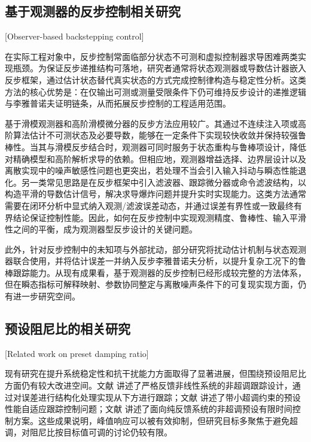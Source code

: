 \subsection{基于观测器的反步控制相关研究}[Observer-based backstepping control]

在实际工程对象中，反步控制常面临部分状态不可测和虚拟控制器求导困难两类实现瓶颈。为保证反步递推结构可落地，研究者通常将状态观测器或导数估计器嵌入反步框架，通过估计状态替代真实状态的方式完成控制律构造与稳定性分析\cite{ref2,ref5,ref74,ref76,ref77}。这类方法的核心优势是：在仅输出可测或测量受限条件下仍可维持反步设计的递推逻辑与李雅普诺夫证明链条，从而拓展反步控制的工程适用范围。

基于滑模观测器和高阶滑模微分器的反步方法应用较广。其通过不连续注入项或高阶算法估计不可测状态及必要导数，能够在一定条件下实现较快收敛并保持较强鲁棒性\cite{ref29,ref30,ref31,ref46}。当其与滑模反步结合时，观测器可同时服务于状态重构与鲁棒项设计，降低对精确模型和高阶解析求导的依赖。但相应地，观测器增益选择、边界层设计以及离散实现中的噪声敏感性问题也更突出，若处理不当会引入输入抖动与瞬态性能退化\cite{ref46,ref48,ref49}。另一类常见思路是在反步框架中引入滤波器、跟踪微分器或命令滤波结构，以构造平滑的导数估计信号，解决求导爆炸问题并提升实时实现能力\cite{ref6,ref7,ref5,ref74,ref76,ref77,ref82}。这类方法通常需要在闭环分析中显式纳入观测/滤波误差动态，并通过误差有界性或一致最终有界结论保证控制性能\cite{ref29,ref30,ref31,ref77,ref82}。因此，如何在反步控制中实现观测精度、鲁棒性、输入平滑性之间的平衡，成为观测器型反步设计的关键问题。

此外，针对反步控制中的未知项与外部扰动，部分研究将扰动估计机制与状态观测器联合使用，并将估计误差一并纳入反步李雅普诺夫分析，以提升复杂工况下的鲁棒跟踪能力\cite{ref24,ref51,ref36,ref32,ref33,ref34,ref35,ref52,ref53,ref54,ref55,ref56,ref77,ref81,ref82}。从现有成果看，基于观测器的反步控制已经形成较完整的方法体系，但在瞬态指标可解释映射、参数协同整定与离散噪声条件下的可复现实现方面，仍有进一步研究空间。

\subsection{预设阻尼比的相关研究}[Related work on preset damping ratio]

现有研究在提升系统稳定性和抗干扰能力方面取得了显著进展，但围绕预设阻尼比方面仍有较大改进空间。文献 讲述了严格反馈非线性系统的非超调跟踪设计，通过对误差进行结构化处理实现从下方进行跟踪；文献 讲述了带小超调约束的预设性能自适应跟踪控制问题；文献 讲述了面向纯反馈系统的非超调预设有限时间控制方案。这些成果说明，峰值响应可以被有效抑制，但研究目标多聚焦于避免超调，对阻尼比按目标值可调的讨论仍较有限。

